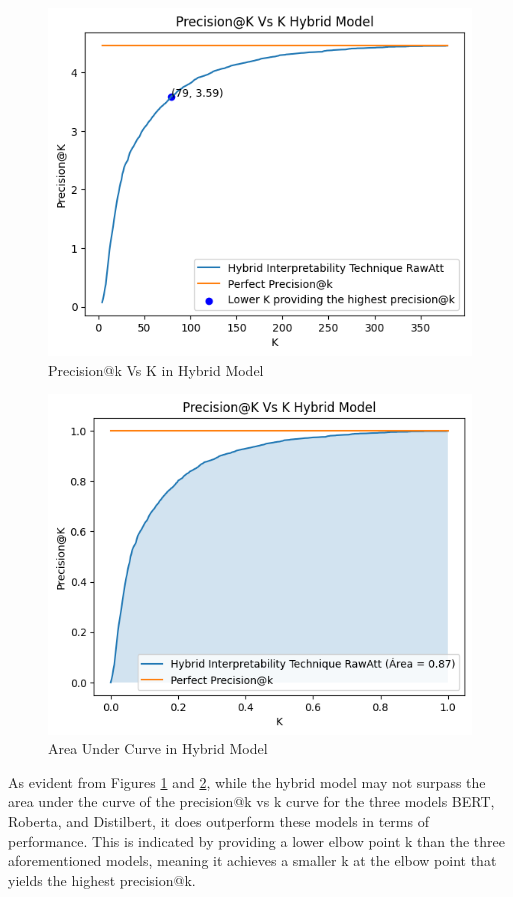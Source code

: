 \begin{figure}[H]
    \centering%
    \includegraphics[width=0.75\linewidth]{Figures/Experimental Setup/RawAtt_Hybrid_Model_Codo.png}
    \caption{Precision@k Vs K in Hybrid Model}
    \label{fig:pkhybrid}
\end{figure}

\begin{figure}[H]
    \centering%
    \includegraphics[width=0.75\linewidth]{Figures/Experimental Setup/RawAtt_Hybrid_Model_AUC.png}
    \caption{Area Under Curve in Hybrid Model}
    \label{fig:auchybrid}
\end{figure}

\newpage

As evident from Figures \ref{fig:pkhybrid} and \ref{fig:auchybrid}, while the hybrid model may not surpass the area under the curve of the precision@k vs k curve for the three models BERT, Roberta, and Distilbert, it does outperform these models in terms of performance. This is indicated by providing a lower elbow point k than the three aforementioned models, meaning it achieves a smaller k at the elbow point that yields the highest precision@k.

